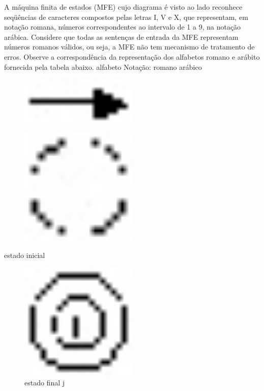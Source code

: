 \documentclass{exam}
\begin{document}
\begin{questions}
A máquina finita de estados (MFE) cujo diagrama é visto ao lado
reconhece seqüências de caracteres compostos pelas letras I, V e X, que
representam, em notação romana, números correspondentes ao intervalo de
1 a 9, na notação arábica. Considere que todas as sentenças de entrada da
MFE representam números romanos válidos, ou seja, a MFE não tem
mecanismo de tratamento de erros. Observe a correspondência da
representação dos alfabetos romano e arábito fornecida pela tabela abaixo.
alfabeto Notação:
romano arábico 
  
\begin{figure}[H]
	\begin{center}
		\includegraphics[width=0.5\textwidth]{CIENCIA_DA_COMPUTACAO_Prova2005-utf8_figuras/fig-0035.jpg}
	\end{center}
\end{figure}

\begin{figure}[H]
	\begin{center}
		\includegraphics[width=0.5\textwidth]{CIENCIA_DA_COMPUTACAO_Prova2005-utf8_figuras/fig-0036.jpg}
	\end{center}
\end{figure}
estado inicial
 
\begin{figure}[H]
	\begin{center}
		\includegraphics[width=0.5\textwidth]{CIENCIA_DA_COMPUTACAO_Prova2005-utf8_figuras/fig-0037.jpg}
		\caption{estado final j}
	\end{center}
\end{figure}
 

\end{questions}
\end{document}
